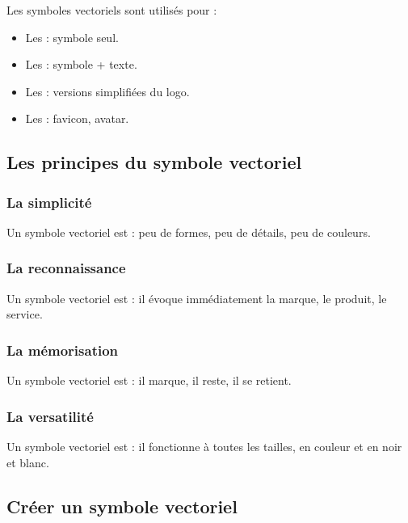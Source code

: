 Les symboles vectoriels sont utilisés pour :

\begin{itemize}
    \item Les  : symbole seul.
    \item Les  : symbole + texte.
    \item Les  : versions simplifiées du logo.
    \item Les  : favicon, avatar.
\end{itemize}

\subsection{Les principes du symbole vectoriel}

\subsubsection{La simplicité}

Un symbole vectoriel est  : peu de formes, peu de détails, peu de couleurs.

\subsubsection{La reconnaissance}

Un symbole vectoriel est  : il évoque immédiatement la marque, le produit, le service.

\subsubsection{La mémorisation}

Un symbole vectoriel est  : il marque, il reste, il se retient.

\subsubsection{La versatilité}

Un symbole vectoriel est  : il fonctionne à toutes les tailles, en couleur et en noir et blanc.

\subsection{Créer un symbole vectoriel}

